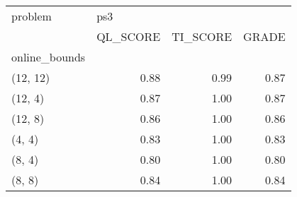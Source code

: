 \begin{tabular}{lrrr}
\toprule
problem & \multicolumn{3}{l}{ps3} \\
{} & QL\_SCORE & TI\_SCORE & GRADE \\
online\_bounds &          &          &       \\
\midrule
(12, 12)      &     0.88 &     0.99 &  0.87 \\
(12, 4)       &     0.87 &     1.00 &  0.87 \\
(12, 8)       &     0.86 &     1.00 &  0.86 \\
(4, 4)        &     0.83 &     1.00 &  0.83 \\
(8, 4)        &     0.80 &     1.00 &  0.80 \\
(8, 8)        &     0.84 &     1.00 &  0.84 \\
\bottomrule
\end{tabular}
